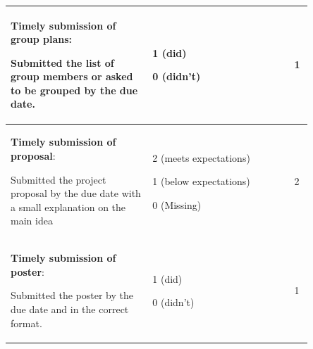 \documentclass[12pt]{article}
\begin{document}
\begin{table}[h!]
\begin{tabular}{p{0.4\linewidth}p{0.4\linewidth}p{0.05\linewidth}}
        \textbf{Timely submission of group plans}:\par Submitted the list of group members or asked to be grouped by the due date. & 1 (did)\par 0 (didn't)& 1\\\midrule
        \textbf{Timely submission of proposal}:\par Submitted the project proposal by the due date with a small explanation on the main idea& 2 (meets expectations)\par 1 (below expectations)\par 0 (Missing)& 2\\\midrule
        \textbf{Timely submission of poster}:\par Submitted the poster by the due date and in the correct format.& 1 (did)\par 0 (didn't)& 1\\
   \bottomrule
    \end{tabular}
    \end{table}
\end{document}
